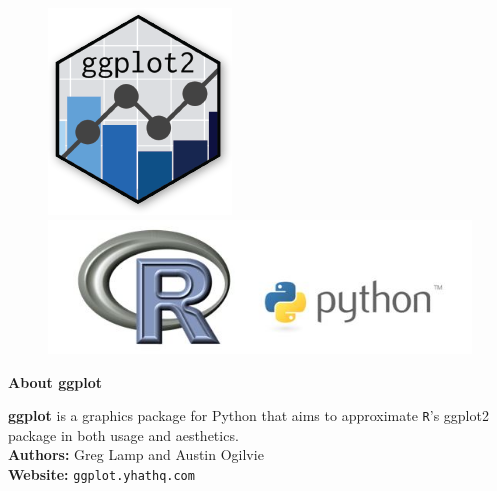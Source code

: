 \documentclass{beamer}
\begin{document}


\begin{frame}
	\begin{figure}
\centering
\includegraphics[width=0.45\linewidth]{ggplot2-official-hexbin-logo}

\includegraphics[width=0.60\linewidth]{RPythonLogo}

\end{figure}

\end{frame}


\begin{frame}
	\Large
	\noindent\textbf{About ggplot}
	\bigskip
	
	\textbf{ggplot} is a graphics package for Python that aims to approximate \texttt{R}'s ggplot2 package in both usage and aesthetics.\\
	\bigskip
	\textbf{Authors:} Greg Lamp and Austin Ogilvie\\
	\bigskip
	\textbf{Website:} \texttt{ggplot.yhathq.com}
\end{frame}
\end{document}
